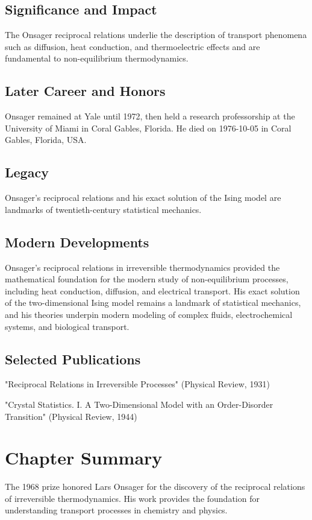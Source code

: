 \subsection*{Significance and Impact}

The Onsager reciprocal relations underlie the description of transport phenomena such as diffusion, heat conduction, and thermoelectric effects and are fundamental to non-equilibrium thermodynamics.

\subsection*{Later Career and Honors}

Onsager remained at Yale until 1972, then held a research professorship at the University of Miami in Coral Gables, Florida. He died on 1976-10-05 in Coral Gables, Florida, USA.

\subsection*{Legacy}

Onsager's reciprocal relations and his exact solution of the Ising model are landmarks of twentieth-century statistical mechanics.

\subsection*{Modern Developments}

Onsager's reciprocal relations in irreversible thermodynamics provided the mathematical foundation for the modern study of non-equilibrium processes, including heat conduction, diffusion, and electrical transport. His exact solution of the two-dimensional Ising model remains a landmark of statistical mechanics, and his theories underpin modern modeling of complex fluids, electrochemical systems, and biological transport.

\subsection*{Selected Publications}

"Reciprocal Relations in Irreversible Processes" (Physical Review, 1931)

"Crystal Statistics. I. A Two-Dimensional Model with an Order-Disorder Transition" (Physical Review, 1944)

\clearpage

\section*{Chapter Summary}

The 1968 prize honored Lars Onsager for the discovery of the reciprocal relations of irreversible thermodynamics. His work provides the foundation for understanding transport processes in chemistry and physics.

